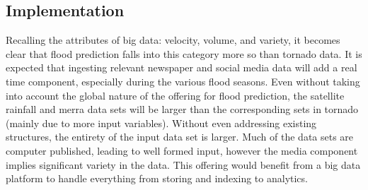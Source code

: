 \subsection{Implementation}
Recalling the attributes of big data: velocity, volume, and variety, it becomes clear that flood prediction falls into this category more so than tornado data. It is expected that ingesting relevant newspaper and social media data will add a real time component, especially during the various flood seasons. Even without taking into account the global nature of the offering for flood prediction, the satellite rainfall and \gls{merra} data sets will be larger than the corresponding sets in tornado (mainly due to more input variables). Without even addressing existing structures, the entirety of the input data set is larger. Much of the data sets are computer published, leading to well formed input, however the media component implies significant variety in the data.  This offering would benefit from a big data platform to handle everything from storing and indexing to analytics.
